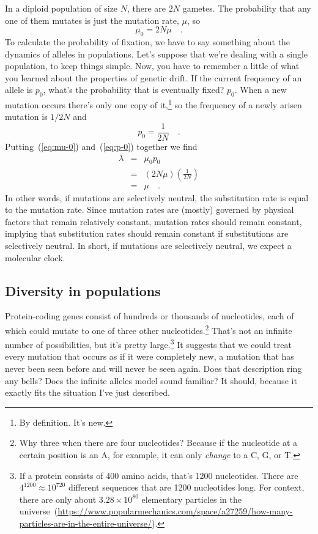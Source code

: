 In a diploid population of size $N$, there are $2N$ gametes. The
probability that any one of them mutates is just the mutation rate,
$\mu$, so
\begin{equation}
\mu_0 = 2N\mu \quad . \label{eq:mu-0}
\end{equation}
To calculate the probability of fixation, we have to say something
about the dynamics of alleles in populations. Let's suppose that we're
dealing with a single population, to keep things simple. Now, you have
to remember a little of what you learned about the properties of
genetic drift. If the current frequency of an allele is $p_0$, what's
the probability that is eventually fixed?  $p_0$. When a new mutation
occurs there's only one copy of it,\footnote{By definition. It's new.}
so the frequency of a newly arisen mutation is $1/2N$ and
\begin{equation}
p_0 = \frac{1}{2N} \quad . \label{eq:p-0}
\end{equation}
Putting~(\ref{eq:mu-0}) and~(\ref{eq:p-0}) together we find
\begin{eqnarray*}
\lambda &=& \mu_0p_0 \\
        &=& (2N\mu)\left(\frac{1}{2N}\right) \\
        &=& \mu \quad .
\end{eqnarray*}
In other words, if mutations are selectively neutral, the substitution
rate is equal to the mutation rate. Since mutation rates are (mostly)
governed by physical factors that remain relatively constant, mutation
rates should remain constant, implying that substitution rates should
remain constant if substitutions are selectively neutral. In short, if
mutations are selectively neutral, we expect a molecular
clock.

\subsection*{Diversity in populations}

Protein-coding genes consist of hundreds or thousands of nucleotides,
each of which could mutate to one of three other
nucleotides.\footnote{Why three when there are four nucleotides?
  Because if the nucleotide at a certain position is an A, for
  example, it can only {\it change\/} to a C, G, or T.} That's not an
infinite number of possibilities, but it's pretty large.\footnote{If a
  protein consists of 400 amino acids, that's 1200 nucleotides. There
  are $4^{1200} \approx 10^{720}$ different sequences that are 1200
  nucleotides long. For context, there are only about
  $3.28 \times 10^{80}$ elementary particles in the
  universe~(\url{https://www.popularmechanics.com/space/a27259/how-many-particles-are-in-the-entire-universe/}).}
It suggests that we could treat every mutation that occurs as if it
were completely new, a mutation that has never been seen before and
will never be seen again. Does that description ring any bells? Does
the infinite alleles model sound familiar? It should, because it
exactly fits the situation I've just
described.

